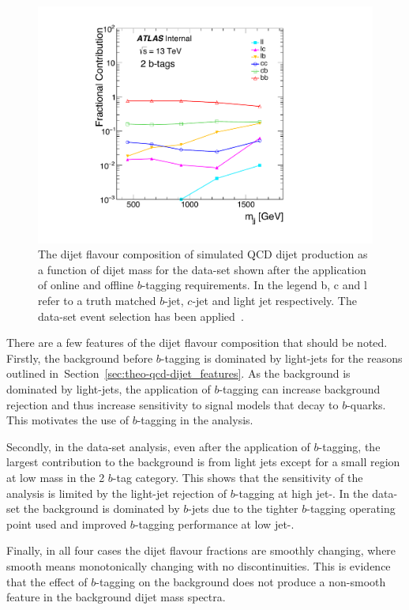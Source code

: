 \begin{figure}[!ht]
  \begin{center}
    \includegraphics[width=0.5\linewidth, angle=0]{figs/Dibjet/LowMass/evt-flavcomp.pdf}
  \end{center}
  \vspace{-1.25em}
  \caption[The dijet flavour composition of simulated QCD dijet production as a function of dijet mass for the \lm{} data-set.]
          {The dijet flavour composition of simulated QCD dijet production as a function of dijet mass for the \lm{} data-set
            shown after the application of online and offline $b$-tagging requirements.
            In the legend b, c and l refer to a truth matched $b$-jet, $c$-jet and light jet respectively.
            The \lm{} data-set event selection has been applied~\cite{dibjet-full}.}
  \label{fig:evt-lowmass_flavcomp}
\end{figure}

\clearpage

There are a few features of the dijet flavour composition that should be noted.
Firstly, the background before $b$-tagging is dominated by light-jets
for the reasons outlined in~Section~\ref{sec:theo-qcd-dijet_features}.
As the background is dominated by light-jets, the application
of $b$-tagging can increase background rejection
and thus increase sensitivity to signal models that decay to $b$-quarks.
This motivates the use of $b$-tagging in the analysis.

Secondly, in the \summer{} data-set analysis,
even after the application of $b$-tagging,
the largest contribution to the background is from light jets
except for a small region at low mass in the 2 $b$-tag category.
This shows that the sensitivity of the analysis is limited by the
light-jet rejection of $b$-tagging at high jet-\pT.
In the \lm{} data-set the background is dominated by $b$-jets
due to the tighter $b$-tagging operating point used and improved $b$-tagging performance at low jet-\pT.

Finally, in all four cases the dijet flavour fractions are smoothly changing,
where smooth means monotonically changing with no discontinuities.
This is evidence that the effect of $b$-tagging on the background does not produce
a non-smooth feature in the background dijet mass spectra.




